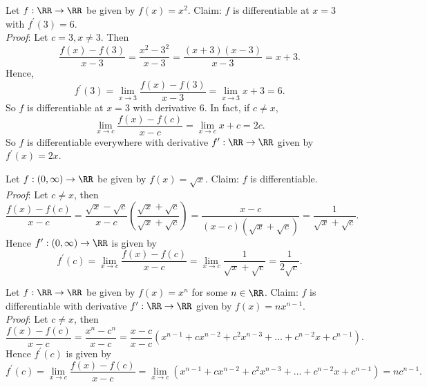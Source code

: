 \documentclass[../real_analysis.tex]{subfiles}
\begin{document}
        \begin{example}
            Let $f:\RR\to\RR$ be given by $f(x)=x^2$. Claim: $f$ is differentiable at $x=3$ with $f^\prime(3)=6$.\\
            \textit{Proof}: Let $c=3, x\neq3$. Then
            \begin{equation*}
                \frac{f(x)-f(3)}{x-3}=\frac{x^2-3^2}{x-3}=\frac{(x+3)(x-3)}{x-3}=x+3.
            \end{equation*}
            Hence,
            \begin{equation*}
                f^\prime(3)=\lim_{x\to3}\frac{f(x)-f(3)}{x-3}=\lim_{x\to3}x+3=6.
            \end{equation*}
            So $f$ is differentiable at $x=3$ with derivative 6. In fact, if $c\neq x$,
            \begin{equation*}
                \lim_{x\to c}\frac{f(x)-f(c)}{x-c}=\lim_{x\to c}x+c=2c.
            \end{equation*}
            So $f$ is differentiable everywhere with derivative $f^\prime:\RR\to\RR$ given by $f^\prime(x)=2x$.
        \end{example}
        \begin{example}
            Let $f:(0,\infty)\to\RR$ be given by $f(x)=\sqrt{x}$. Claim: $f$ is differentiable.\\
            \textit{Proof}: Let $c\neq x$, then
            \begin{equation*}
                \frac{f(x)-f(c)}{x-c}=\frac{\sqrt{x}-\sqrt{c}}{x-c}\left(\frac{\sqrt{x}+\sqrt{c}}{\sqrt{x}+\sqrt{c}}\right)=\frac{x-c}{(x-c)(\sqrt{x}+\sqrt{c})}=\frac{1}{\sqrt{x}+\sqrt{c}}.
            \end{equation*}
            Hence $f^\prime:(0,\infty)\to\RR$ is given by
            \begin{equation*}
                f^\prime(c)=\lim_{x\to c}\frac{f(x)-f(c)}{x-c}=\lim_{x\to c}\frac{1}{\sqrt{x}+\sqrt{c}}=\frac{1}{2\sqrt{c}}.
            \end{equation*}
        \end{example}
        \begin{example}
            Let $f:\RR\to\RR$ be given by $f(x)=x^n$ for some $n\in\RR$. Claim: $f$ is differentiable with derivative $f^\prime:\RR\to\RR$ given by $f(x)=nx^{n-1}$.\\
            \textit{Proof}: Let $c\neq x$, then
            \begin{equation*}
                \frac{f(x)-f(c)}{x-c}=\frac{x^n-c^n}{x-c}=\frac{x-c}{x-c}(x^{n-1}+cx^{n-2}+c^2x^{n-3}+\dots+c^{n-2}x+c^{n-1}).
            \end{equation*}
            Hence $f^\prime(c)$ is given by
            \begin{equation*}
                f^\prime(c)=\lim_{x\to c}\frac{f(x)-f(c)}{x-c}=\lim_{x\to c}(x^{n-1}+cx^{n-2}+c^2x^{n-3}+\dots+c^{n-2}x+c^{n-1})=nc^{n-1}.
            \end{equation*}
        \end{example}
\end{document}
